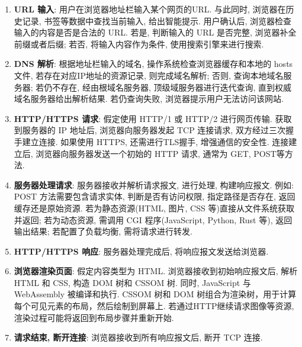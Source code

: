\documentclass{ned-article}
\begin{document}
\begin{enumerate}
    \item \textbf{URL 输入}: 用户在浏览器地址栏输入某个网页的URL. 与此同时, 浏览器在历史记录, 书签等数据中查找当前输入, 给出智能提示. 用户确认后, 浏览器检查输入的内容是否是合法的 URL. 若是, 判断输入的 URL 是否完整, 浏览器补全前缀或者后缀; 若否, 将输入内容作为条件, 使用搜索引擎来进行搜索.
    \item \textbf{DNS 解析}: 根据地址栏输入的域名, 操作系统检查浏览器缓存和本地的 hosts 文件, 若存在对应IP地址的资源记录, 则完成域名解析; 否则, 查询本地域名服务器; 若仍不存在, 经由根域名服务器, 顶级域服务器进行迭代查询, 直到权威域名服务器给出解析结果. 若仍查询失败, 浏览器提示用户无法访问该网站.
    \item \textbf{HTTP/HTTPS 请求}: 假定使用 HTTP/1 或 HTTP/2 进行网页传输. 获取到服务器的 IP 地址后, 浏览器向服务器发起 TCP 连接请求, 双方经过三次握手建立连接. 如果使用 HTTPS, 还需进行TLS握手, 增强通信的安全性. 连接建立后, 浏览器向服务器发送一个初始的 HTTP 请求, 通常为 GET, POST等方法.
    \item \textbf{服务器处理请求}: 服务器接收并解析请求报文, 进行处理, 构建响应报文. 例如: POST 方法需要包含请求实体, 判断是否有访问权限, 指定路径是否存在, 返回缓存还是原始资源. 若为静态资源(HTML, 图片, CSS 等)直接从文件系统获取并返回; 若为动态资源, 需调用 CGI 程序(JavaScript, Python, Rust 等), 返回输出结果; 若配置了负载均衡, 需将请求进行转发.
    \item \textbf{HTTP/HTTPS 响应}: 服务器处理完成后, 将响应报文发送给浏览器. 
    \item \textbf{浏览器渲染页面}: 假定内容类型为 HTML. 浏览器接收到初始响应报文后, 解析 HTML 和 CSS, 构造 DOM 树和 CSSOM 树. 同时, JavaScript 与 WebAssembly 被编译和执行. CSSOM 树和 DOM 树组合为渲染树，用于计算每个可见元素的布局，然后绘制到屏幕上. 若通过HTTP继续请求图像等资源, 渲染过程可能将返回到布局步骤并重新开始. 
    \item \textbf{请求结束, 断开连接}: 浏览器接收到所有响应报文后, 断开 TCP 连接.
\end{enumerate}

\setupappendix








\end{document}
